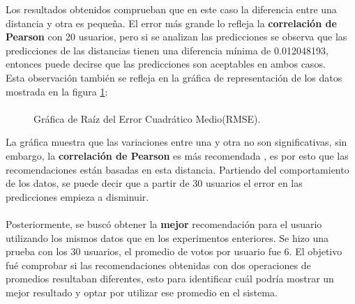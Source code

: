 \documentclass[12pt,letterpaper,oneside] {memoir}
\begin{document}
Los resultados obtenidos comprueban que en este caso la diferencia entre una distancia y otra es pequeña.
El error más grande lo refleja la \textbf{correlación de Pearson} con 20 usuarios, pero si se analizan las predicciones se observa que  las predicciones de las distancias tienen una diferencia mínima de 0.012048193, entonces puede decirse que las predicciones son aceptables en ambos casos.\\
Esta observación también se refleja en la gráfica de representación de los datos mostrada en la figura \ref{fig:graficarmsd}:
\paragraph*{}
\begin{figure}[H]
\centering 
{} \caption{Gráfica de Raíz del Error Cuadrático Medio(RMSE).} 
\label{fig:graficarmsd} 
\end{figure}

La gráfica muestra que las variaciones entre una y otra no son significativas, sin embargo, la \textbf{correlación de Pearson} es más recomendada \citep{GalanNieto1994, Burke2002, Garciavaldez2009, Adomavicius2005}, es por esto que las recomendaciones están basadas en esta distancia. Partiendo del comportamiento de los datos, se puede decir que a partir de 30 usuarios el error en las predicciones empieza a disminuir. 
\paragraph{}
Posteriormente, se buscó obtener la \textbf{mejor} recomendación para el usuario utilizando los mismos datos que en los experimentos enteriores. Se hizo una prueba con los 30 usuarios, el promedio de votos por usuario fue 6. 
El objetivo fué comprobar si las recomendaciones obtenidas con dos operaciones de promedios resultaban diferentes, esto para identificar cuál podría mostrar un mejor resultado y optar por utilizar ese promedio en el sistema. 
\end{document}
